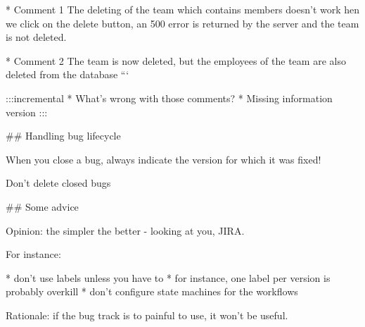 * Comment 1
  The deleting of the team which contains members doesn't work
  hen we click on the delete button, an 500 error is returned by the
  server and the team is not deleted.

* Comment 2
  The team is now deleted, but the employees of the team are also
  deleted from the database
```

:::incremental
* What's wrong with those comments?
* Missing information version
:::

## Handling bug lifecycle

When you close a bug, always indicate the version for which it was fixed!

Don't delete closed bugs

## Some advice

Opinion: the simpler the better - looking at you, JIRA.

For instance:

* don't use labels unless you have to
    * for instance, one label per version is probably overkill
* don't configure state machines for the workflows

Rationale: if the bug track is to painful to use, it won't be useful.
